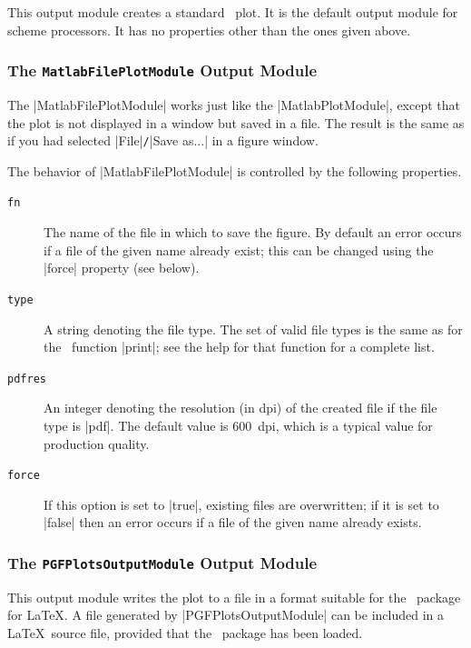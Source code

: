 This output module creates a standard \matlab\ plot. It is the default output
module for scheme processors. It has no properties other than the ones given
above.


\subsubsection{The \texttt{MatlabFilePlotModule} Output Module}

The |MatlabFilePlotModule| works just like the |MatlabPlotModule|, except that
the plot is not displayed in a window but saved in a file. The result is the
same as if you had selected |File|\texttt{\slash}|Save as...| in a figure
window. 

The behavior of |MatlabFilePlotModule| is controlled by the following
properties.
\begin{description}
  \item[\texttt{fn}] The name of the file in which to save the figure. By
    default an error occurs if a file of the given name already exist; this can
    be changed using the |force| property (see below).

  \item[\texttt{type}] A string denoting the file type. The set of valid file
    types is the same as for the \matlab\ function |print|; see the help for
    that function for a complete list. 

  \item[\texttt{pdfres}] An integer denoting the resolution (in dpi) of the
    created file if the file type is |pdf|. The default value is 600~dpi, which
    is a typical value for production quality.

  \item[\texttt{force}]  If this option is set to |true|, existing files are
    overwritten; if it is set to |false| then an error occurs if a file of the
    given name already exists.
\end{description}


\subsubsection{The \texttt{PGFPlotsOutputModule} Output Module}

This output module writes the plot to a file in a format suitable for the
\pgfplots\ package for \LaTeX. A file generated by |PGFPlotsOutputModule| can be
included in a \LaTeX\ source file, provided that the \pgfplots\ package has been
loaded. 

